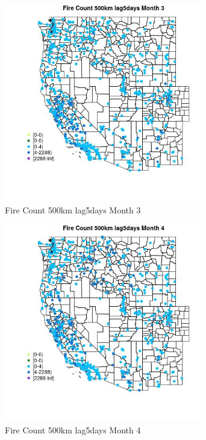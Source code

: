 \begin{figure} 
\centering  
\includegraphics[width=0.77\textwidth]{Code_Outputs/Report_ML_input_PM25_Step4_part_e_de_duplicated_aves_compiled_2019-05-21wNAs_MapObsMo3Fire_Count_500km_lag5days.jpg} 
\caption{\label{fig:Report_ML_input_PM25_Step4_part_e_de_duplicated_aves_compiled_2019-05-21wNAsMapObsMo3Fire_Count_500km_lag5days}Fire Count 500km lag5days Month 3} 
\end{figure} 
 

\begin{figure} 
\centering  
\includegraphics[width=0.77\textwidth]{Code_Outputs/Report_ML_input_PM25_Step4_part_e_de_duplicated_aves_compiled_2019-05-21wNAs_MapObsMo4Fire_Count_500km_lag5days.jpg} 
\caption{\label{fig:Report_ML_input_PM25_Step4_part_e_de_duplicated_aves_compiled_2019-05-21wNAsMapObsMo4Fire_Count_500km_lag5days}Fire Count 500km lag5days Month 4} 
\end{figure} 
 

